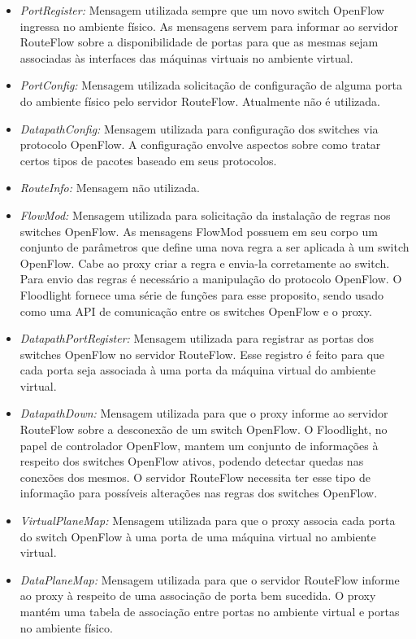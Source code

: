 \begin{itemize}
\item \textit{PortRegister:} Mensagem utilizada sempre que um
novo switch OpenFlow ingressa no ambiente físico. As mensagens 
servem para informar ao servidor RouteFlow sobre a disponibilidade
de portas para que as mesmas sejam associadas às interfaces
das máquinas virtuais no ambiente virtual.
\item \textit{PortConfig:} Mensagem utilizada solicitação de 
configuração de alguma porta do ambiente físico pelo servidor
RouteFlow. Atualmente não é utilizada.
\item \textit{DatapathConfig:} Mensagem utilizada para
configuração dos switches via protocolo OpenFlow. A 
configuração envolve aspectos sobre como tratar certos tipos
de pacotes baseado em seus protocolos.
\item \textit{RouteInfo:} Mensagem não utilizada.
\item \textit{FlowMod:} Mensagem utilizada para 
solicitação da instalação de regras nos switches 
OpenFlow. As mensagens FlowMod possuem em seu 
corpo um conjunto de parâmetros que define uma nova regra 
a ser aplicada à um switch OpenFlow. Cabe ao proxy 
criar a regra e envia-la corretamente ao switch. 
Para envio das regras é necessário a manipulação do 
protocolo OpenFlow. O Floodlight fornece uma série de 
funções para esse proposito, sendo usado como uma 
API de comunicação entre os switches OpenFlow e o 
proxy.
\item \textit{DatapathPortRegister:} Mensagem utilizada 
para registrar as portas dos switches OpenFlow 
no servidor RouteFlow. Esse registro é feito para que cada 
porta seja associada à uma porta da máquina 
virtual do ambiente virtual.
\item \textit{DatapathDown:} Mensagem utilizada para que 
o proxy informe ao servidor RouteFlow sobre a 
desconexão de um switch OpenFlow. O Floodlight, no papel 
de controlador OpenFlow, mantem um conjunto de 
informações à respeito dos switches OpenFlow ativos, 
podendo detectar quedas nas conexões dos mesmos. O 
servidor RouteFlow necessita ter esse tipo de informação para 
possíveis alterações nas regras dos 
switches OpenFlow.
\item \textit{VirtualPlaneMap:} Mensagem utilizada para que 
o proxy associa cada porta do switch 
OpenFlow à uma porta de uma máquina virtual no ambiente 
virtual.
\item \textit{DataPlaneMap:} Mensagem utilizada para que o 
servidor RouteFlow informe ao proxy à 
respeito de uma associação de porta bem sucedida. O proxy 
mantém uma tabela de associação entre portas 
no ambiente virtual e portas no ambiente físico.
\end{itemize}

